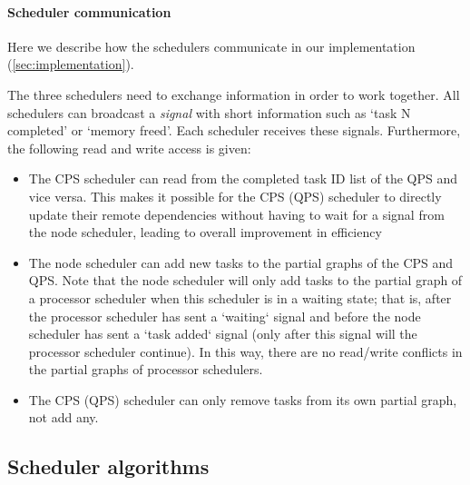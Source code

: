 \paragraph{Scheduler communication}
Here we describe how the schedulers communicate in our implementation (\cref{sec:implementation}).

The three schedulers need to exchange information in order to work together.
All schedulers can broadcast a \textit{signal} with short information such as `task N completed' or `memory freed'. Each scheduler receives these signals.
Furthermore, the following read and write access is given:
\begin{itemize}
    \item The CPS scheduler can read from the completed task ID list of the QPS and vice versa. This makes it possible for the CPS (QPS) scheduler to directly update their remote dependencies without having to wait for a signal from the node scheduler, leading to overall improvement in efficiency
    \item The node scheduler can add new tasks to the partial graphs of the CPS and QPS. Note that the node scheduler will only add tasks to the partial graph of a processor scheduler when this scheduler is in a waiting state; that is, after the processor scheduler has sent a `waiting` signal and before the node scheduler has sent a `task added` signal (only after this signal will the processor scheduler continue). In this way, there are no read/write conflicts in the partial graphs of processor schedulers.
    \item The CPS (QPS) scheduler can only remove tasks from its own partial graph, not add any.
\end{itemize}


\subsection{Scheduler algorithms}

